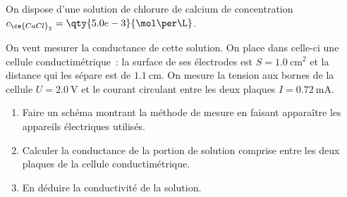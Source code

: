 On dispose d'une solution de chlorure de calcium de concentration
$c_{\ce{CaCl}_2}=\qty{5.0e-3}{\mol\per\L}$.

On veut mesurer la conductance de cette solution. On place dans celle-ci une
cellule conductimétrique~: la surface de ses électrodes est
$S=\qty{1.0}{\square\cm}$ et la distance qui les sépare est de $\qty{1.1}{\cm}$.
On mesure la tension aux bornes de la cellule $U=\qty{2.0}{\V}$ et le courant
circulant entre les deux plaques $I=\qty{0.72}{\mA}$.
\begin{enumerate}
    \item Faire un schéma montrant la méthode de mesure en faisant apparaître
          les appareils électriques utilisés.
    \item Calculer la conductance de la portion de solution comprise entre les
          deux plaques de la cellule conductimétrique.
    \item En déduire la conductivité de la solution.
\end{enumerate}
